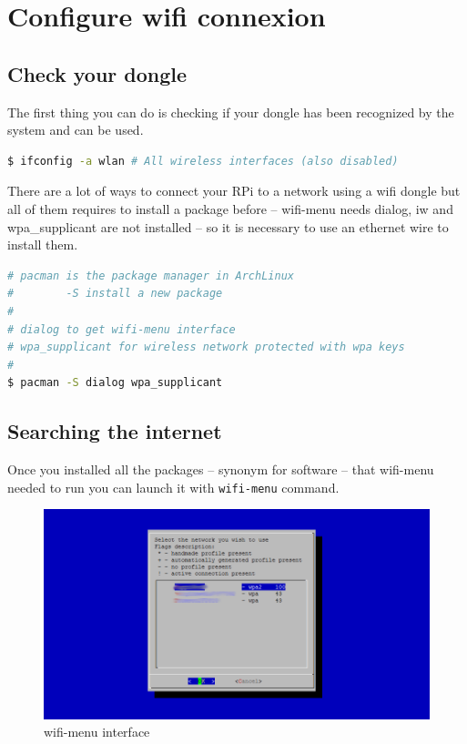 \section{Configure wifi connexion}
\subsection{Check your dongle}
The first thing you can do is checking if your dongle has been recognized by 
the system and can be used.

\begin{lstlisting}[language=bash,caption=Check wifi device]
$ ifconfig -a wlan # All wireless interfaces (also disabled)
\end{lstlisting}

There are a lot of ways to connect your RPi to a network using a wifi dongle 
but all of them requires to install a package before -- wifi-menu needs 
dialog, iw and wpa\_supplicant are not installed -- so it is necessary to 
use an ethernet wire to install them.
\newpage
\begin{lstlisting}[language=bash,caption=Install wireless dependencies]
# pacman is the package manager in ArchLinux
#        -S install a new package 
#
# dialog to get wifi-menu interface
# wpa_supplicant for wireless network protected with wpa keys
#
$ pacman -S dialog wpa_supplicant
\end{lstlisting}

\subsection{Searching the internet}
Once you installed all the packages -- synonym for software -- that wifi-menu 
needed to run you can launch it with \og{}\texttt{wifi-menu}\fg{} command.

\begin{figure}[h]
	\centering
	\includegraphics[scale=0.3]{images/WifiMenu.png}
	\caption{wifi-menu interface}
	\label{figure:WifiMenu}
\end{figure}

